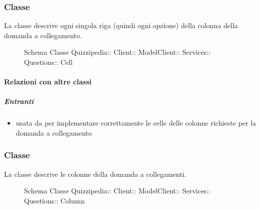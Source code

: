 \subsubsection{Classe }
La classe descrive ogni singola riga (quindi ogni opzione) della colonna della domanda a collegamento.
\begin{figure}[H]
\centering
\noindent{}
\caption[Schema Classe Cell]{Schema Classe Quizzipedia:: Client:: ModelClient:: Services:: Questions:: Cell}
\end{figure}
\paragraph{Relazioni con altre classi}
\subparagraph{Entranti}
\begin{itemize}
\item usata da  per implementare correttamente le celle delle colonne richieste per la domanda a collegamento
\end{itemize}
\subsubsection{Classe }
La classe descrive le colonne della domanda a collegamenti.
\begin{figure}[H]
\centering
\noindent{}
\caption[Schema Classe Column]{Schema Classe Quizzipedia:: Client:: ModelClient:: Services:: Questions:: Column}
\end{figure}
